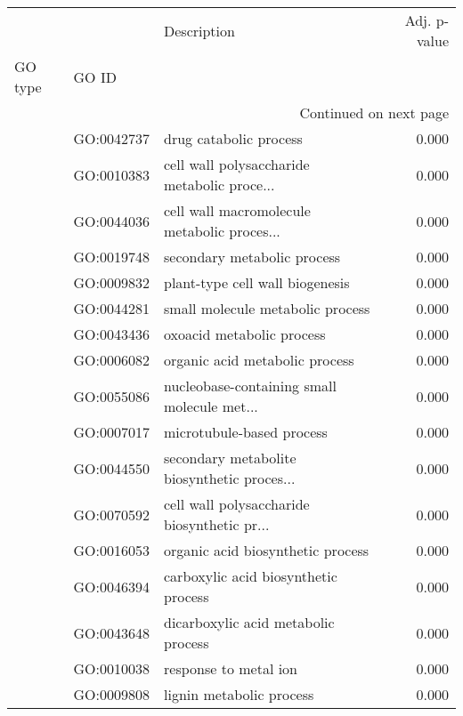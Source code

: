 \begin{longtable}{lllr}
\toprule
   &            &                                  Description &  Adj. p-value \\
GO type & GO ID &                                              &               \\
\midrule
\endhead
\midrule
\multicolumn{4}{r}{{Continued on next page}} \\
\midrule
\endfoot

\bottomrule
\endlastfoot
\multirow{117}{*}{BP} & GO:0042737 &                       drug catabolic process &         0.000 \\
   & GO:0010383 &  cell wall polysaccharide metabolic proce... &         0.000 \\
   & GO:0044036 &  cell wall macromolecule metabolic proces... &         0.000 \\
   & GO:0019748 &                  secondary metabolic process &         0.000 \\
   & GO:0009832 &              plant-type cell wall biogenesis &         0.000 \\
   & GO:0044281 &             small molecule metabolic process &         0.000 \\
   & GO:0043436 &                    oxoacid metabolic process &         0.000 \\
   & GO:0006082 &               organic acid metabolic process &         0.000 \\
   & GO:0055086 &  nucleobase-containing small molecule met... &         0.000 \\
   & GO:0007017 &                    microtubule-based process &         0.000 \\
   & GO:0044550 &  secondary metabolite biosynthetic proces... &         0.000 \\
   & GO:0070592 &  cell wall polysaccharide biosynthetic pr... &         0.000 \\
   & GO:0016053 &            organic acid biosynthetic process &         0.000 \\
   & GO:0046394 &         carboxylic acid biosynthetic process &         0.000 \\
   & GO:0043648 &          dicarboxylic acid metabolic process &         0.000 \\
   & GO:0010038 &                        response to metal ion &         0.000 \\
   & GO:0009808 &                     lignin metabolic process &         0.000 \\

\end{longtable}

